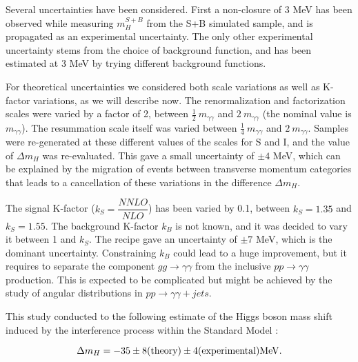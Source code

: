 Several uncertainties have been considered. First a non-closure of 3 MeV has been observed while measuring $m_H^{S+B}$ from the S+B simulated sample, and is propagated as an experimental uncertainty. The only other experimental uncertainty stems from the choice of background function, and has been estimated at 3 MeV by trying different background functions.

For theoretical uncertainties we considered both scale variations as well as K-factor variations, as we will describe now.
The renormalization and factorization scales were varied by a factor of 2, between $\frac{1}{2}~m_{\gamma\gamma}$ and $2~m_{\gamma\gamma}$ (the nominal value is $m_{\gamma\gamma}$). The resummation scale itself was varied between $\frac{1}{4}~m_{\gamma\gamma}$ and $2~m_{\gamma\gamma}$. Samples were re-generated at these different values of the scales for S and I, and the value of $\Delta m_H$ was re-evaluated. This gave a small uncertainty of $\pm 4$ MeV, which can be explained by the migration of events between transverse momentum categories that leads to a cancellation of these variations in the difference $\Delta m_H$.

The signal K-factor ($k_S = \dfrac{NNLO}{NLO}$) has been varied by 0.1, between $k_S = 1.35$ and $k_S = 1.55$. The background K-factor $k_B$ is not known, and it was decided to vary it between 1 and $k_S$. The recipe gave an uncertainty of $\pm 7$ MeV, which is the dominant uncertainty. Constraining $k_B$ could lead to a huge improvement, but it requires to separate the component $gg \rightarrow \gamma\gamma$ from the inclusive $pp \rightarrow \gamma\gamma$ production. This is expected to be complicated but might be achieved by the study of angular distributions in $pp \rightarrow \gamma\gamma+jets$.

This study conducted to the following estimate of the Higgs boson mass shift induced by the interference process within the Standard Model :

\begin{equation}
    \Delta m_H = -35 \pm 8 {\rm{(theory)}} \pm 4 {\rm{(experimental) MeV}}.
\end{equation}

